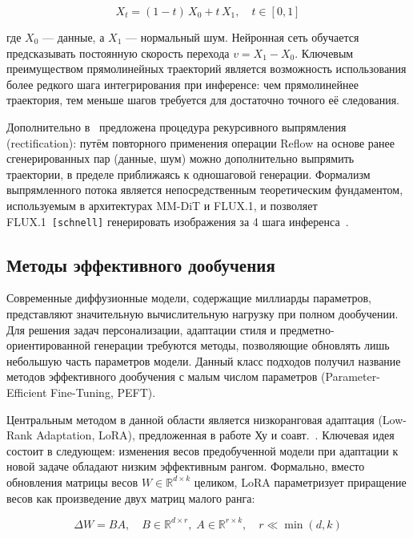 \begin{equation}
    X_t = (1 - t)\, X_0 + t\, X_1, \quad t \in [0, 1]
    \label{eq:rectflow_interp}
\end{equation}

где $X_0$ --- данные, а $X_1$ --- нормальный шум. Нейронная сеть обучается предсказывать постоянную скорость перехода $v = X_1 - X_0$. Ключевым преимуществом прямолинейных траекторий является возможность использования более редкого шага интегрирования при инференсе: чем прямолинейнее траектория, тем меньше шагов требуется для достаточно точного её следования.

Дополнительно в~\cite{liu2022rectifiedflow} предложена процедура рекурсивного выпрямления (rectification): путём повторного применения операции Reflow на основе ранее сгенерированных пар (данные, шум) можно дополнительно выпрямить траектории, в пределе приближаясь к одношаговой генерации. Формализм выпрямленного потока является непосредственным теоретическим фундаментом, используемым в архитектурах MM-DiT и FLUX.1, и позволяет FLUX.1~\texttt{[schnell]} генерировать изображения за 4 шага инференса~\cite{blackforest2024flux}.


\subsection{Методы эффективного дообучения}

Современные диффузионные модели, содержащие миллиарды параметров, представляют значительную вычислительную нагрузку при полном дообучении. Для решения задач персонализации, адаптации стиля и предметно-ориентированной генерации требуются методы, позволяющие обновлять лишь небольшую часть параметров модели. Данный класс подходов получил название методов эффективного дообучения с малым числом параметров (Parameter-Efficient Fine-Tuning, PEFT).

Центральным методом в данной области является низкоранговая адаптация (Low-Rank Adaptation, LoRA), предложенная в работе Ху и соавт.~\cite{hu2022lora}. Ключевая идея состоит в следующем: изменения весов предобученной модели при адаптации к новой задаче обладают низким эффективным рангом. Формально, вместо обновления матрицы весов $W \in \mathbb{R}^{d \times k}$ целиком, LoRA параметризует приращение весов как произведение двух матриц малого ранга:

\begin{equation}
    \Delta W = B A, \quad B \in \mathbb{R}^{d \times r},\; A \in \mathbb{R}^{r \times k}, \quad r \ll \min(d, k)
    \label{eq:lora}
\end{equation}

